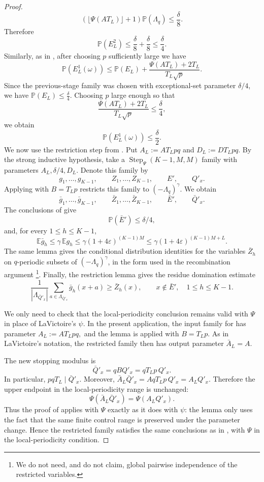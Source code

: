 \documentclass[12pt,leqno]{amsart}
\numberwithin{equation}{section}
\numberwithin{counter2}{section}
\theoremstyle{definition}
\theoremstyle{plain}
\begin{document}
\begin{proof}
	\[
	(\lfloor \Psi(AT_L)\rfloor+1)\mathbb P(\Lambda_q)
	\leq
	\frac{\delta}{8}.
	\]
	Therefore
	\[
	\mathbb P(E_L^2)\leq \frac{\delta}{8}+\frac{\delta}{8}
	\leq
	\frac{\delta}{4}. 
	\] 
    Similarly, as in \cite[Section~5]{L9}, after choosing \(p\) sufficiently large
we have
\[
\mathbb P(E_L^1(\omega))
\leq
\mathbb P(E_L)
+
\frac{\Psi(AT_L)+2T_L}{T_L\sqrt p}.
\]
Since the previous-stage family was chosen with exceptional-set parameter
\(\delta/4\), we have $\mathbb P(E_L)\leq \frac{\delta}{4}.$
Choosing \(p\) large enough so that
\[
\frac{\Psi(AT_L)+2T_L}{T_L\sqrt p}
\leq
\frac{\delta}{4},
\]
we obtain
\[
\mathbb P(E_L^1(\omega))\leq \frac{\delta}{2}.
\]
We now use the restriction step from \cite[Lemma~7.1]{L9}. Put $A_L:=AT_Lpq$ and $D_L:=DT_Lpq.$
By the strong inductive hypothesis, take a
\(\operatorname{Step}_{\Psi}(K-1,M,M)\) family with parameters
\(A_L,\delta/4,D_L\). Denote this family by
\[
g_1,\dots,g_{K-1},
\qquad
Z_1,\dots,Z_{K-1},
\qquad
E',
\qquad
Q'_x.
\]
Applying \cite[Lemma~7.1]{L9} with \(B=T_Lp\) restricts this family to
\((-\Lambda_q)^\gamma\). We obtain
\[
\bar g_1,\dots,\bar g_{K-1},
\qquad
\bar Z_1,\dots,\bar Z_{K-1},
\qquad
\bar E',
\qquad
\bar Q'_x.
\]
The conclusions of \cite[Lemma~7.1]{L9} give
\[
\mathbb P(\bar E')\leq \delta/4,
\]
and, for every \(1\leq h\leq K-1\),
\[
\mathbb E\bar g_h
\leq
\gamma\,\mathbb E g_h
\leq
\gamma(1+4\varepsilon)^{(K-1)M}
\leq
\gamma(1+4\varepsilon)^{(K-1)M+L}.
\]
The same lemma gives the conditional distribution identities for the variables
\(\bar Z_h\) on \(q\)-periodic subsets of \((-\Lambda_q)^\gamma\), in the form
used in the recombination argument \cite[(8.7)]{L9}\footnote{We do not need, and do not
claim, global pairwise independence of the restricted variables.}.  Finally, the
restriction lemma gives the residue domination estimate
\[
\frac1{|\Lambda_{\bar Q'_x}|}
\sum_{a\in\Lambda_{\bar Q'_x}}
\bar g_h(x+a)
\geq
\bar Z_h(x),
\qquad
x\notin\bar E',
\quad
1\leq h\leq K-1.
\]

We only need to check that the local-periodicity conclusion remains valid with
\(\Psi\) in place of LaVictoire's \(\psi\). In the present application, the
input family for \cite[Lemma~7.1]{L9} has parameter $A_L:=AT_Lpq,$
and the lemma is applied with \(B=T_Lp\). As in LaVictoire's notation, the
restricted family then has output parameter $\bar A_L=A.$

The new stopping modulus is
\[
\bar Q'_x=qBQ'_x=qT_Lp\,Q'_x.
\]
In particular, $pqT_L\mid \bar Q'_x.$
Moreover, $\bar A_L\bar Q'_x
=
AqT_Lp\,Q'_x
=
A_LQ'_x.$
Therefore the upper endpoint in the local-periodicity range is unchanged:
\[
\Psi(\bar A_L\bar Q'_x)
=
\Psi(A_LQ'_x).
\]
Thus the proof of \cite[Lemma~7.1]{L9} applies with \(\Psi\) exactly as it does
with \(\psi\): the lemma only uses the fact that the same finite control range is
preserved under the parameter change. Hence the restricted family satisfies the
same conclusions as in \cite[Lemma~7.1]{L9}, with \(\Psi\) in the
local-periodicity condition.
	

\end{proof}
\end{document}
